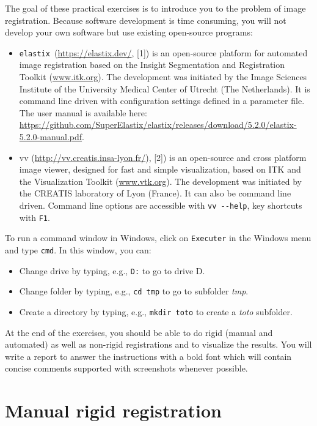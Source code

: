 \documentclass[]{report}
\newcommand{\elastix}{\texttt{elastix}}
\begin{document}
The goal of these practical exercises is to introduce you to the problem of
image registration. Because software development is time consuming, you will
not develop your own software but use existing open-source programs:
\begin{itemize}
\item \elastix\ (\url{https://elastix.dev/}, [1]) is an open-source
    platform for automated image registration based on the Insight
    Segmentation and Registration Toolkit (\url{www.itk.org}). The
    development was initiated by the Image Sciences Institute of the
    University Medical Center of Utrecht (The Netherlands). It is command
    line driven with configuration settings defined in a parameter file.
    The user manual is available here:
    \url{https://github.com/SuperElastix/elastix/releases/download/5.2.0/elastix-5.2.0-manual.pdf}.
\item vv (\url{http://vv.creatis.insa-lyon.fr/}), [2]) is an open-source
    and cross platform image viewer, designed for fast and simple
    visualization, based on ITK and the Visualization Toolkit
    (\url{www.vtk.org}). The development was initiated by the CREATIS
    laboratory of Lyon (France). It can also be command line driven.
    Command line options are accessible with \verb+vv --help+, key
    shortcuts with \verb+F1+.
\end{itemize}

To run a command window in Windows, click on \verb+Executer+ in the Windows
menu and type \verb+cmd+. In this window, you can:
\begin{itemize}
    \item Change drive by typing, e.g., \verb+D:+ to go to drive D.
    \item Change folder by typing, e.g., \verb+cd tmp+ to go to subfolder
\textit{tmp}.
    \item Create a directory by typing, e.g., \verb+mkdir toto+ to create a
\textit{toto} subfolder.
\end{itemize}

At the end of the exercises, you should be able to do rigid (manual and
automated) as well as non-rigid registrations and to visualize the results. You
will write a report to answer the instructions with a bold font which will
contain concise comments supported with screenshots whenever possible.

\section{Manual rigid registration}
\end{document}
